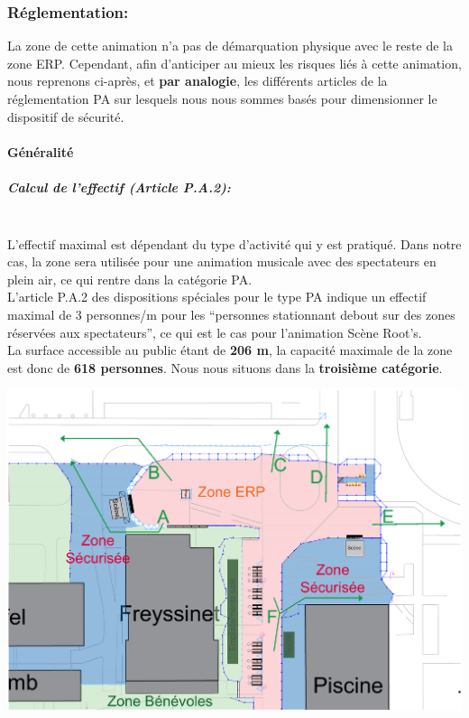\documentclass[hidelinks, paper=a4, fontsize=13pt]{report}
\begin{document}
\subsubsection{Réglementation:}
La zone de cette animation n'a pas de démarquation physique avec le reste de la zone ERP. Cependant, afin d’anticiper au mieux les risques liés à cette animation, nous reprenons ci-après, et \textbf{par analogie}, les différents articles de la réglementation PA sur lesquels nous nous sommes basés pour dimensionner le dispositif de sécurité. 

\newpage

\paragraph{Généralité}
\subparagraph*{Calcul de l'effectif (Article P.A.2):}\mbox{}\\
L’effectif maximal est dépendant du type d’activité qui y est pratiqué. Dans notre cas, la zone sera utilisée pour une animation musicale avec des spectateurs en plein air, ce qui rentre dans la catégorie PA. \\

L’article P.A.2 des dispositions spéciales pour le type PA indique un effectif maximal de 3 personnes/m  pour les “personnes stationnant debout sur des zones réservées aux spectateurs”, ce qui est le cas pour l’animation Scène Root's. \\

La surface accessible au public étant de \textbf{206 m}, la capacité maximale de la zone est donc de \textbf{618 personnes}. Nous nous situons dans la \textbf{troisième catégorie}. \\



\begin{center}
	\includegraphics[width=.75\textwidth,keepaspectratio]{Exports/Plan_24h_45eme-3e_Scene_Circ_Autour}
\end{center}
\end{document}
